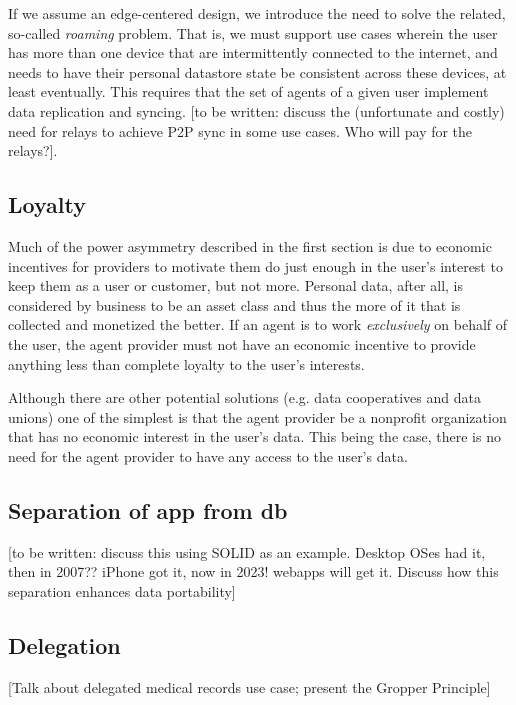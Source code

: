 \documentclass[11pt, oneside]{article}   	%
\begin{document}
If we assume an edge-centered design, we introduce the need to solve the related, so-called \emph{roaming} problem. That is, we must support use cases wherein the user has more than one device that are intermittently connected to the internet, and needs to have their personal datastore state be consistent across these devices, at least eventually. This requires that the set of agents of a given user implement data replication and syncing. [to be written: discuss the (unfortunate and costly) need for relays to achieve P2P sync in some use cases. Who will pay for the relays?].

\subsection{Loyalty}

Much of the power asymmetry described in the first section is due to economic incentives for providers to motivate them do just enough in the user's interest to keep them as a user or customer, but not more. Personal data, after all, is considered by business to be an asset class and thus the more of it that is collected and monetized the better. If an agent is to work \emph{exclusively} on behalf of the user, the agent provider must not have an economic incentive to provide anything less than complete loyalty to the user's interests. 

Although there are other potential solutions (e.g. data cooperatives and data unions) one of the simplest is that the agent provider be a nonprofit organization that has no economic interest in the user's data. This being the case, there is no need for the agent provider to have any access to the user's data.

\subsection{Separation of app from db}

[to be written: discuss this using SOLID as an example. Desktop OSes had it, then in 2007?? iPhone got it, now in 2023! webapps will get it. Discuss how this separation enhances data portability]

\subsection{Delegation}

[Talk about delegated medical records use case; present the Gropper Principle]
\end{document}
